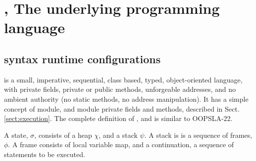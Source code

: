 \section{\LangOO, The underlying programming language } %

\subsection{\LangOO syntax runtime configurations}
\label{sub:Loo} 
 \LangOO  is a {small}, imperative, sequential,  class based, typed, object-oriented language, %
 with private fields, private or public methods, unforgeable addresses, and no ambient authority (no static methods, no address manipulation).
 It has a simple concept of module, and module private fields and methods, described in Sect. \ref{sect:execution}.
The complete definition of , and is  similar to   OOPSLA-22.

A \LangOO state, $\sigma$,  consists of a  heap $\chi$, and a   stack $\psi$. A stack is is a sequence of frames, $\phi$.
A frame consists of local variable map, and a continuation, \ie a sequence of statements to be executed.


 
